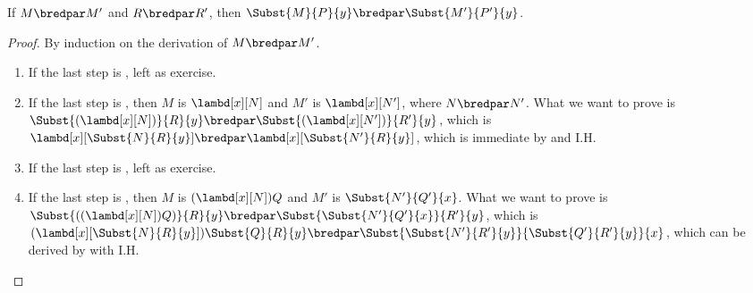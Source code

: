 \documentclass[../../../include/open-logic-section]{subfiles}
\begin{document}
\begin{lem}
  If $M \bredpar M'$ and $R \bredpar R'$, then $\Subst{M}{P}{y}
  \bredpar \Subst{M'}{P'}{y}$.
\end{lem}
\begin{proof}
  By induction on the derivation of $M \bredpar M'$.
  \begin{enumerate}
    \item If the last step is , left as exercise.
    \item If the last step is , then $M$ is 
      $\lambd[x][N]$ and $M'$ is $\lambd[x][N']$,
      where $N \bredpar N'$. What we want to prove is
      $\Subst{(\lambd[x][N])}{R}{y} \bredpar
      \Subst{(\lambd[x][N'])}{R'}{y}$, which is
      $\lambd[x][\Subst{N}{R}{y}] \bredpar
      \lambd[x][\Subst{N'}{R}{y}]$, which is immediate by
       and I.H.
    \item If the last step is , left as exercise.
    \item If the last step is , then $M$ is
      $(\lambd[x][N])Q$ and $M'$ is $\Subst{N'}{Q'}{x}$. What
      we want to prove is $\Subst{((\lambd[x][N])Q)}{R}{y}
      \bredpar \Subst{\Subst{N'}{Q'}{x}}{R'}{y}$, which is
      $(\lambd[x][\Subst{N}{R}{y}])\Subst{Q}{R}{y} \bredpar
      \Subst{\Subst{N'}{R'}{y}}{\Subst{Q'}{R'}{y}}{x}$, which
      can be derived by  with I.H.
  \end{enumerate}
\end{proof}
\end{document}
